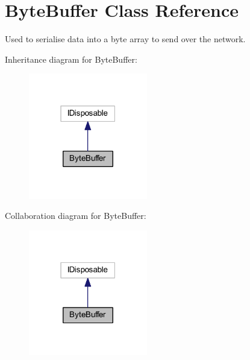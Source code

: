 \hypertarget{class_byte_buffer}{}\section{Byte\+Buffer Class Reference}
\label{class_byte_buffer}


Used to serialise data into a byte array to send over the network.  




Inheritance diagram for Byte\+Buffer\+:\nopagebreak
\begin{figure}[H]
\begin{center}
\leavevmode
\includegraphics[width=147pt]{class_byte_buffer__inherit__graph}
\end{center}
\end{figure}


Collaboration diagram for Byte\+Buffer\+:\nopagebreak
\begin{figure}[H]
\begin{center}
\leavevmode
\includegraphics[width=147pt]{class_byte_buffer__coll__graph}
\end{center}
\end{figure}
